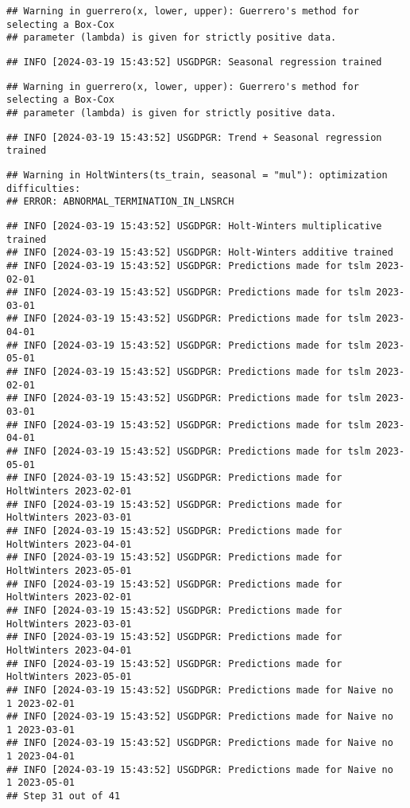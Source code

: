 \documentclass[
]{article}
\begin{document}
\begin{verbatim}
## Warning in guerrero(x, lower, upper): Guerrero's method for selecting a Box-Cox
## parameter (lambda) is given for strictly positive data.
\end{verbatim}

\begin{verbatim}
## INFO [2024-03-19 15:43:52] USGDPGR: Seasonal regression trained
\end{verbatim}

\begin{verbatim}
## Warning in guerrero(x, lower, upper): Guerrero's method for selecting a Box-Cox
## parameter (lambda) is given for strictly positive data.
\end{verbatim}

\begin{verbatim}
## INFO [2024-03-19 15:43:52] USGDPGR: Trend + Seasonal regression trained
\end{verbatim}

\begin{verbatim}
## Warning in HoltWinters(ts_train, seasonal = "mul"): optimization difficulties:
## ERROR: ABNORMAL_TERMINATION_IN_LNSRCH
\end{verbatim}

\begin{verbatim}
## INFO [2024-03-19 15:43:52] USGDPGR: Holt-Winters multiplicative trained
## INFO [2024-03-19 15:43:52] USGDPGR: Holt-Winters additive trained
## INFO [2024-03-19 15:43:52] USGDPGR: Predictions made for tslm 2023-02-01
## INFO [2024-03-19 15:43:52] USGDPGR: Predictions made for tslm 2023-03-01
## INFO [2024-03-19 15:43:52] USGDPGR: Predictions made for tslm 2023-04-01
## INFO [2024-03-19 15:43:52] USGDPGR: Predictions made for tslm 2023-05-01
## INFO [2024-03-19 15:43:52] USGDPGR: Predictions made for tslm 2023-02-01
## INFO [2024-03-19 15:43:52] USGDPGR: Predictions made for tslm 2023-03-01
## INFO [2024-03-19 15:43:52] USGDPGR: Predictions made for tslm 2023-04-01
## INFO [2024-03-19 15:43:52] USGDPGR: Predictions made for tslm 2023-05-01
## INFO [2024-03-19 15:43:52] USGDPGR: Predictions made for HoltWinters 2023-02-01
## INFO [2024-03-19 15:43:52] USGDPGR: Predictions made for HoltWinters 2023-03-01
## INFO [2024-03-19 15:43:52] USGDPGR: Predictions made for HoltWinters 2023-04-01
## INFO [2024-03-19 15:43:52] USGDPGR: Predictions made for HoltWinters 2023-05-01
## INFO [2024-03-19 15:43:52] USGDPGR: Predictions made for HoltWinters 2023-02-01
## INFO [2024-03-19 15:43:52] USGDPGR: Predictions made for HoltWinters 2023-03-01
## INFO [2024-03-19 15:43:52] USGDPGR: Predictions made for HoltWinters 2023-04-01
## INFO [2024-03-19 15:43:52] USGDPGR: Predictions made for HoltWinters 2023-05-01
## INFO [2024-03-19 15:43:52] USGDPGR: Predictions made for Naive no  1 2023-02-01
## INFO [2024-03-19 15:43:52] USGDPGR: Predictions made for Naive no  1 2023-03-01
## INFO [2024-03-19 15:43:52] USGDPGR: Predictions made for Naive no  1 2023-04-01
## INFO [2024-03-19 15:43:52] USGDPGR: Predictions made for Naive no  1 2023-05-01
## Step 31 out of 41
\end{verbatim}
\end{document}
